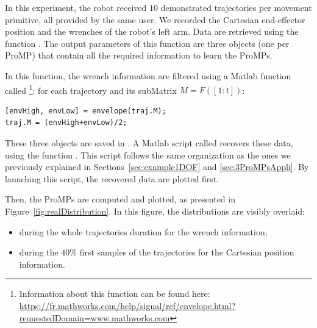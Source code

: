 \documentclass[utf8]{frontiersSCNS} %
\newcommand{\rev}[1]{\textcolor{blue}{#1}}
\begin{document}
In this experiment, the robot received $10$ demonstrated trajectories per movement primitive, all provided by the same user. We recorded the Cartesian end-effector position and the wrenches of the robot's left arm. Data are retrieved using the function . The output parameters of this function are three objects (one per ProMP) that contain all the required information to learn the ProMPs. 

In this function, the wrench information are filtered using a Matlab function called \footnote{Information about this function can be found here: \url{https://fr.mathworks.com/help/signal/ref/envelope.html?requestedDomain=www.mathworks.com}}: for each trajectory  and its subMatrix $M = F([1:t])$:
\begin{lstlisting}
[envHigh, envLow] = envelope(traj.M);
traj.M = (envHigh+envLow)/2;
\end{lstlisting}
These three objects are saved in . A Matlab script called  recovers these data, using the function . This script follows the same organization as the ones we previously explained in Sections~\ref{sec:example1DOF} and \ref{sec:3ProMPsAppli}. 
By launching this script, the recovered data are plotted first.


Then, the ProMPs are computed and plotted, as presented in Figure~\ref{fig:realDistribution}.
In this figure, the distributions are visibly overlaid:
\begin{itemize}
\item during the whole trajectories duration for the wrench information;
\item during the $40\%$ first samples of the trajectories for the Cartesian position information.
\end{itemize}
\end{document}
